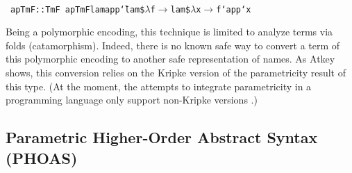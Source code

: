 \documentclass[9pt,authoryear]{sigplanconf}
\begin{document}
%
%
%
~\\~\vphantom{$\{$}\texttt{apTmF}\texttt{\mbox{\hspace{0.50em}}}\texttt{{:}{:}}\texttt{\mbox{\hspace{0.50em}}}\texttt{TmF}\texttt{{\nopagebreak \newline%
}\vphantom{$\{$}}\texttt{apTmF}\texttt{\mbox{\hspace{0.50em}}}\texttt{lam}\texttt{\mbox{\hspace{0.50em}}}\texttt{app}\texttt{\mbox{\hspace{0.50em}}}\texttt{{\char `\=}}\texttt{\mbox{\hspace{0.50em}}}\texttt{lam}\texttt{\mbox{\hspace{0.50em}}}\texttt{\${}}\texttt{\mbox{\hspace{0.50em}}}\texttt{$ \lambda $}\texttt{\mbox{\hspace{0.50em}}}\texttt{f}\texttt{\mbox{\hspace{0.50em}}}\texttt{$ \rightarrow $}\texttt{\mbox{\hspace{0.50em}}}\texttt{lam}\texttt{\mbox{\hspace{0.50em}}}\texttt{\${}}\texttt{\mbox{\hspace{0.50em}}}\texttt{$ \lambda $}\texttt{\mbox{\hspace{0.50em}}}\texttt{x}\texttt{\mbox{\hspace{0.50em}}}\texttt{$ \rightarrow $}\texttt{\mbox{\hspace{0.50em}}}\texttt{f}\texttt{\mbox{\hspace{0.50em}}}\texttt{{`}app{`}}\texttt{\mbox{\hspace{0.50em}}}\texttt{x}\texttt{{\nopagebreak \newline%
}\vphantom{$\{$}}%


%
Being a polymorphic encoding, this technique is limited to analyze
    terms via folds (catamorphism). Indeed, there is no known safe
    way to convert a term of this polymorphic encoding to another
    safe representation of names. As Atkey shows, this conversion
    relies on the Kripke version of the parametricity result of this
    type. (At the moment, the attempts to integrate parametricity in
    a programming language only support non-Kripke versions \cite{keller_parametricity_2012,bernardy_computational_2012,bernardy_type-theory_2013}.)%


\subsection{Parametric Higher-Order Abstract Syntax (PHOAS)}
\end{document}
